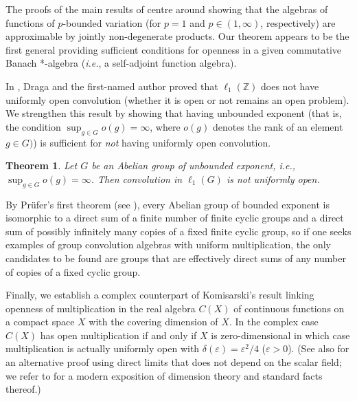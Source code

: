 \documentclass[12pt,fleqn]{amsart}
\newcounter{maintheorem}
\newtheorem{mainth}[maintheorem]{Theorem}
\theoremstyle{definition}
\numberwithin{equation}{section}
\theoremstyle{remark}
\begin{document}
The proofs of the main results of \cite{canarias2021multiplication, kowalczyk2019multiplication} centre around showing that the algebras of functions of $p$-bounded variation (for $p = 1$ and $p\in (1,\infty)$, respectively) are approximable by jointly non-degenerate products. Our theorem appears to be the first general providing sufficient conditions for openness in a given commutative Banach *-algebra (\emph{i.e.}, a self-adjoint function algebra).\medskip

In \cite[Corollary 4.13]{DraKa}, Draga and the first-named author proved that $\ell_1(\mathbb Z)$ does not have uniformly open convolution (whether it is open or not remains an open problem). We strengthen this result by showing that having unbounded exponent (that is, the condition $\sup_{g\in G} o(g) = \infty$, where $o(g)$ denotes the rank of an element $g\in G)$) is sufficient for \emph{not} having uniformly open convolution. 
%
\begin{mainth}\label{thm:B}
    Let $G$ be an Abelian group of unbounded exponent, i.e.,  $\sup_{g\in G} o(g) = \infty$. Then convolution in $\ell_1(G)$ is not uniformly open.
\end{mainth}
%
By Pr\"ufer's first theorem (see \cite[p.~173]{kurosh1955theory}), every Abelian group of bounded exponent is isomorphic to a direct sum of a finite number of finite cyclic groups and a direct sum of possibly infinitely many copies of a fixed finite cyclic group, so if one seeks examples of group convolution algebras with uniform multiplication, the only candidates to be found are groups that are effectively direct sums of any number of copies of a fixed cyclic group.\medskip

Finally, we establish a complex counterpart of Komisarski's result \cite{komisarski2006connection} linking openness of multiplication in the real algebra $C(X)$ of continuous functions on a compact  space $X$ with the covering dimension of $X$. In the complex case $C(X)$ has open multiplication if and only if $X$ is zero-dimensional in which case multiplication is actually uniformly open with $\delta(\varepsilon) = \varepsilon^2 / 4$ ($\varepsilon > 0$). (See also \cite[Proposition 4.16]{DraKa} for an alternative proof using direct limits that does not depend on the scalar field; we refer to \cite{engelking1978dimension} for a modern exposition of dimension theory and standard facts thereof.)
\end{document}

